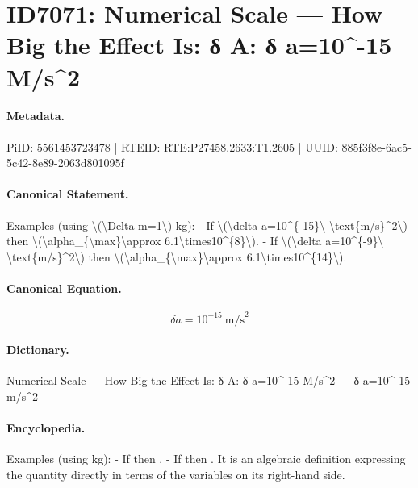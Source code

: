 \section*{ID7071: Numerical Scale — How Big the Effect Is: δ A: δ a=10\textasciicircum{}-15 M/s\textasciicircum{}2}
\paragraph{Metadata.}
PiID: 5561453723478 | RTEID: RTE:P27458.2633:T1.2605 | UUID: 885f3f8e-6ac5-5c42-8e89-2063d801095f

\paragraph{Canonical Statement.}
Examples (using \textbackslash{}(\textbackslash{}Delta m=1\textbackslash{}) kg): - If \textbackslash{}(\textbackslash{}delta a=10\textasciicircum{}\{-15\}\textbackslash{} \textbackslash{}text\{m/s\}\textasciicircum{}2\textbackslash{}) then \textbackslash{}(\textbackslash{}alpha\_\{\textbackslash{}max\}\textbackslash{}approx 6.1\textbackslash{}times10\textasciicircum{}\{8\}\textbackslash{}). - If \textbackslash{}(\textbackslash{}delta a=10\textasciicircum{}\{-9\}\textbackslash{} \textbackslash{}text\{m/s\}\textasciicircum{}2\textbackslash{}) then \textbackslash{}(\textbackslash{}alpha\_\{\textbackslash{}max\}\textbackslash{}approx 6.1\textbackslash{}times10\textasciicircum{}\{14\}\textbackslash{}).

\paragraph{Canonical Equation.}
\[
\delta a=10^{-15}\ \text{m/s}^2
\]

\paragraph{Dictionary.}
Numerical Scale — How Big the Effect Is: δ A: δ a=10\textasciicircum{}-15 M/s\textasciicircum{}2 — δ a=10\textasciicircum{}-15 m/s\textasciicircum{}2

\paragraph{Encyclopedia.}
Examples (using kg): - If then . - If then . It is an algebraic definition expressing the quantity directly in terms of the variables on its right-hand side.
